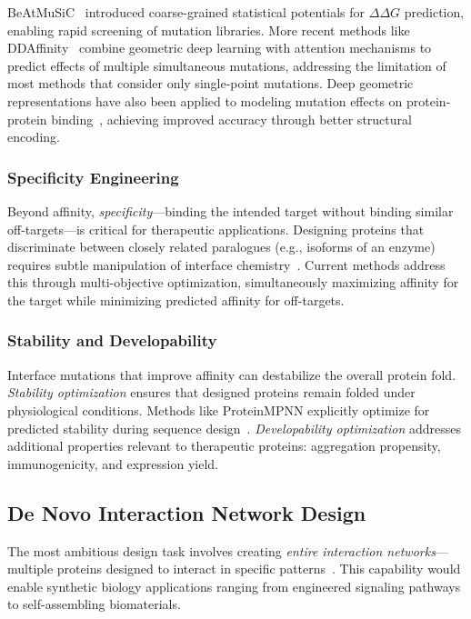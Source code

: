 BeAtMuSiC~\cite{dehouck2013beatmusic} introduced coarse-grained statistical potentials for $\Delta\Delta G$ prediction, enabling rapid screening of mutation libraries. More recent methods like DDAffinity~\cite{luo2024ddaffinity} combine geometric deep learning with attention mechanisms to predict effects of multiple simultaneous mutations, addressing the limitation of most methods that consider only single-point mutations. Deep geometric representations have also been applied to modeling mutation effects on protein-protein binding~\cite{qiu2024ipe}, achieving improved accuracy through better structural encoding.

\subsubsection{Specificity Engineering}

Beyond affinity, \textit{specificity}---binding the intended target without binding similar off-targets---is critical for therapeutic applications. Designing proteins that discriminate between closely related paralogues (e.g., isoforms of an enzyme) requires subtle manipulation of interface chemistry~\cite{rodrigues2019mcsm}. Current methods address this through multi-objective optimization, simultaneously maximizing affinity for the target while minimizing predicted affinity for off-targets.

\subsubsection{Stability and Developability}

Interface mutations that improve affinity can destabilize the overall protein fold. \textit{Stability optimization} ensures that designed proteins remain folded under physiological conditions. Methods like ProteinMPNN explicitly optimize for predicted stability during sequence design~\cite{dauparas2022proteinmpnn}. \textit{Developability optimization} addresses additional properties relevant to therapeutic proteins: aggregation propensity, immunogenicity, and expression yield.

\subsection{De Novo Interaction Network Design}
\label{subsec:network}

The most ambitious design task involves creating \textit{entire interaction networks}---multiple proteins designed to interact in specific patterns~\cite{watson2023rfdiffusion}. This capability would enable synthetic biology applications ranging from engineered signaling pathways to self-assembling biomaterials.

